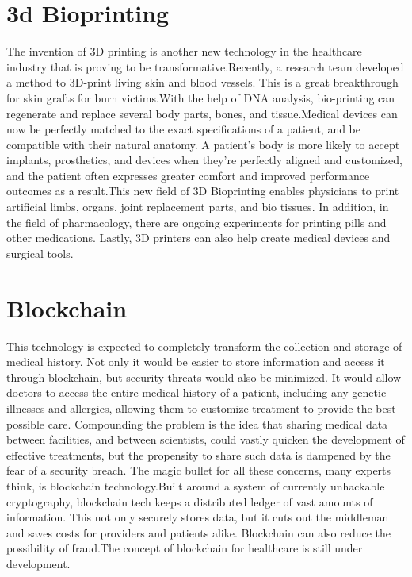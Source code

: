 \documentclass{article}[A4,12pt]
\begin{document}
\section{3d Bioprinting}
The invention of 3D printing is another new technology in the healthcare industry that is proving to be transformative.Recently, a research team developed a method to 3D-print living skin and blood vessels. This is a great breakthrough for skin grafts for burn victims.With the help of DNA analysis, bio-printing can regenerate and replace several body parts, bones, and tissue.Medical devices can now be perfectly matched to the exact specifications of a patient, and be compatible with their natural anatomy. A patient’s body is more likely to accept implants, prosthetics, and devices when they’re perfectly aligned and customized, and the patient often expresses greater comfort and improved performance outcomes as a result.This new field of 3D Bioprinting enables physicians to print artificial limbs, organs, joint replacement parts, and bio tissues. In addition, in the field of pharmacology, there are ongoing experiments for printing pills and other medications. Lastly, 3D printers can also help create medical devices and surgical tools.


\section{Blockchain}
This technology is expected to completely transform the collection and storage of medical history. Not only it would be easier to store information and access it through blockchain, but security threats would also be minimized. It would allow doctors to access the entire medical history of a patient, including any genetic illnesses and allergies, allowing them to customize treatment to provide the best possible care. Compounding the problem is the idea that sharing medical data between facilities, and between scientists, could vastly quicken the development of effective treatments, but the propensity to share such data is dampened by the fear of a security breach. The magic bullet for all these concerns, many experts think, is blockchain technology.Built around a system of currently unhackable cryptography, blockchain tech keeps a distributed ledger of vast amounts of information. This not only securely stores data, but it cuts out the middleman and saves costs for providers and patients alike. Blockchain can also reduce the possibility of fraud.The concept of blockchain for healthcare is still under development.
\end{document}
